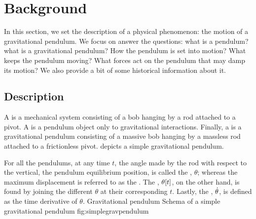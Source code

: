 \newcommand{\angpos}{\theta}     %
\newcommand{\angvel}{\dt\theta}  %
\newcommand{\angacc}{\ddt\theta} %
\newcommand{\torque}{\tau}       %
\newcommand{\fcoeff}{\alpha}     %
\newcommand{\oscper}{\tau}       %
\newcommand{\natfreq}{\omega}    %
\newcommand{\cycfreq}{f}         %
%
\newcommand{\lvel}{v} %
\newcommand{\lacc}{a} %
%
\newcommand{\height}{h}        %
\newcommand{\disp}{x}          %
\newcommand{\odisp}{x}         %
\newcommand{\ovel}{\dt\odisp}  %
\newcommand{\oacc}{\ddt\odisp} %
\newcommand{\oper}{\tau}       %
%
\newcommand{\scovel}{\dt{\scpq{\odisp}}}  %
\newcommand{\scoacc}{\ddt{\scpq{\odisp}}} %
%
\newcommand{\angfreq}{\omega} %


\section{Background}
In this section, we set the description of a physical phenomenon: the motion of a gravitational pendulum. We focus on answer the questions: what is a pendulum? what is a gravitational pendulum? How the pendulum is set into motion? What keeps the pendulum moving? What forces act on the pendulum that may damp its motion? We also provide a bit of some historical information about it.


\subsection{Description}
A  is a mechanical system consisting of a bob hanging by a rod attached to a pivot.  A  is a pendulum object only to gravitational interactions. Finally, a  is a gravitational pendulum consisting of a massive bob hanging by a massless rod attached to a frictionless pivot.  depicts a simple gravitational pendulum. 

For all the pendulums, at any time $t$, the angle made by the rod with respect to the vertical, the pendulum equilibrium position, is called the , $\angpos$; whereas the maximum displacement is referred to as the . The , $\angpos\vat t$, on the other hand, is found by joining the different $\angpos$ at their corresponding $t$. Lastly, the , $\angvel$, is defined as the time derivative of $\angpos$.
%
%
   {Gravitational pendulum}
   {Schema of a simple gravitational pendulum}%
   {fig:simplegravpendulum}%

